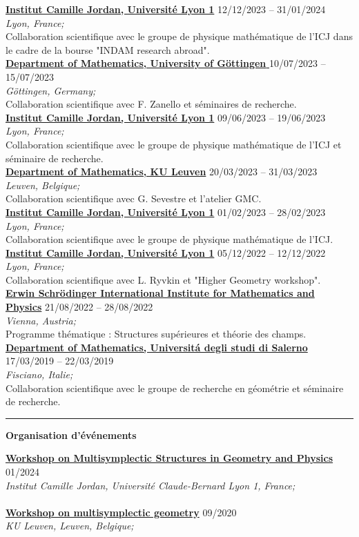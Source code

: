 \documentclass[a4paper]{article}
\newcommand{\block}[1]{\hrule \vspace{0.2cm} \textbf{\Large #1} \vspace{0.2cm}}
\newcommand{\voice}[5]{\href{#4}{\textbf{#1}} \hfill #2 \\ \textit{#3} \\ {\small #5} \vspace{0.2cm} \\}
\begin{document}
    
    \voice{Institut Camille Jordan, Université Lyon 1}
        {12/12/2023 -- 31/01/2024}
        {Lyon, France;}
        {None}       
        {Collaboration scientifique avec le groupe de physique mathématique de l'ICJ dans le cadre de la bourse "INDAM research abroad".}
    \voice{Department of Mathematics, University of Göttingen }
        {10/07/2023 -- 15/07/2023}
        {Göttingen, Germany;}
        {None}       
        {Collaboration scientifique avec F. Zanello et séminaires de recherche.}
    \voice{Institut Camille Jordan, Université Lyon 1}
        {09/06/2023 -- 19/06/2023}
        {Lyon, France;}
        {None}       
        {Collaboration scientifique avec le groupe de physique mathématique de l'ICJ et séminaire de recherche.}
    \voice{Department of Mathematics, KU Leuven}
        {20/03/2023 -- 31/03/2023}
        {Leuven, Belgique;}
        {None}       
        {Collaboration scientifique avec G. Sevestre et l'atelier GMC.}
    \voice{Institut Camille Jordan, Université Lyon 1}
        {01/02/2023 -- 28/02/2023}
        {Lyon, France;}
        {None}       
        {Collaboration scientifique avec le groupe de physique mathématique de l'ICJ.}
    \voice{Institut Camille Jordan, Université Lyon 1}
        {05/12/2022 -- 12/12/2022}
        {Lyon, France;}
        {None}       
        {Collaboration scientifique avec L. Ryvkin et "Higher Geometry workshop".}
    \voice{Erwin Schrödinger International Institute for Mathematics and Physics}
        {21/08/2022 -- 28/08/2022}
        {Vienna, Austria;}
        {https://www.esi.ac.at/events/e430/}       
        {Programme thématique : Structures supérieures et théorie des champs.}
    \voice{Department of Mathematics, Universit\'a degli studi di Salerno}
        {17/03/2019 -- 22/03/2019}
        {Fisciano, Italie;}
        {http://geometria.dipmat.unisa.it/events.html}       
        {Collaboration scientifique avec le groupe de recherche en géométrie et séminaire de recherche.}

        




    \block{Organisation d'événements}

    
    \voice{Workshop on Multisymplectic Structures in Geometry and Physics}
        {01/2024}
        {Institut Camille Jordan, Université Claude-Bernard Lyon 1, France;}
        {https://math.gmu.edu/~cblacke/lyon.html}       
        {\vspace{-0.5cm}}
    \voice{Workshop on multisymplectic geometry}
        {09/2020}
        {KU Leuven, Leuven, Belgique;}
        {https://wis.kuleuven.be/events/multisymplectic}       
        {\vspace{-0.5cm}}
\end{document}

